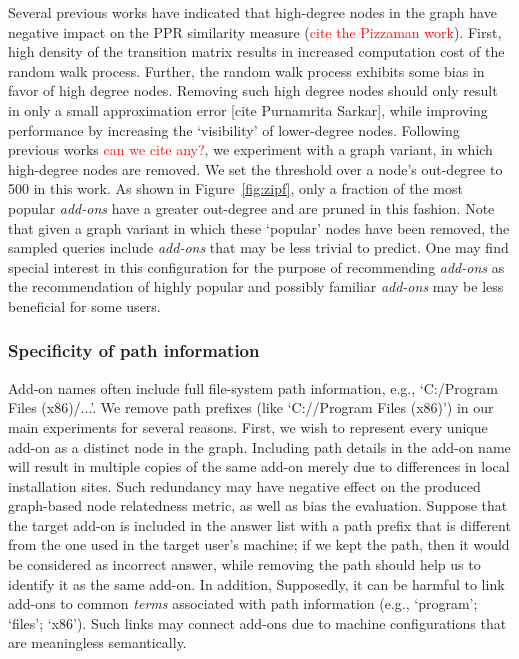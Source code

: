 \documentclass[11pt,oneside]{book}
\let\Oldsubsubsection\subsubsection
\renewcommand{\subsubsection}{\FloatBarrier\Oldsubsubsection}
\begin{document}
Several previous works have indicated that high-degree nodes in the graph have negative impact on the PPR similarity measure (\textcolor{red}{cite the Pizzaman work}). First, high density of the transition matrix results in increased computation cost of the random walk process. Further, the random walk process exhibits some bias in favor of high degree nodes. Removing such high degree nodes should only result in only a small approximation error [cite Purnamrita Sarkar], while improving performance by increasing the `visibility' of lower-degree
nodes. Following previous works \textcolor{red}{can we cite any?},
we experiment with a graph variant, in which high-degree nodes are
removed. We set the threshold over a node's out-degree to 500 in this
work. As shown in Figure~\ref{fig:zipf}, only a fraction of the most popular {\it add-ons} have a greater out-degree and are pruned in this fashion. Note that given a graph variant in which these `popular' nodes have been removed, the sampled queries include {\it add-ons} that may be less trivial to predict. One may find special interest in this configuration for the purpose of recommending {\it add-ons} as the recommendation of highly popular and possibly familiar {\it add-ons} may be less beneficial for some users. 

\subsubsection{Specificity of path information} 

Add-on names often include full file-system path information, e.g., `C:/Program Files (x86)/...'. We remove path prefixes (like `C://Program Files (x86)') in our main experiments for several reasons. First, we wish to represent every unique add-on as a distinct node in the graph. Including path details in the add-on name will result in multiple copies of the same add-on merely due to differences in local installation sites. Such redundancy may have negative effect on the produced  graph-based node relatedness metric, as well as bias the evaluation. Suppose that the target add-on is included in the answer list with a path prefix that is different from the one used in the target user's machine; if we kept the path, then it would be considered as incorrect answer, while removing the path should help us to identify it as the same add-on. In addition, Supposedly, it can be harmful to link add-ons to common {\it terms} associated with path information (e.g., `program'; `files'; `x86'). Such links may connect add-ons due to machine configurations that are meaningless semantically.
\end{document}
